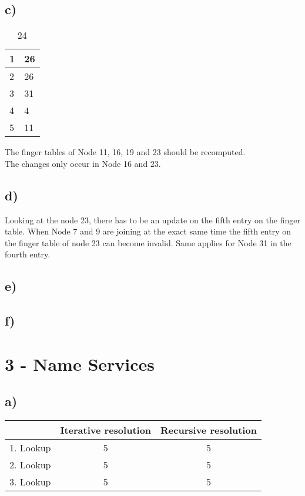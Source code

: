 \documentclass{scrartcl}
\begin{document}
\subsection*{c)}
\begin{table}[!ht]
	\centering
	\begin{tabular}{|l|l|}
		\hline
		1 & 26 \\ \hline
		2 & 26 \\ \hline
		3 & 31 \\ \hline
		4 & 4 \\ \hline
		5 & 11 \\ \hline
	\end{tabular}
	\caption{24}
\end{table}
The finger tables of Node 11, 16, 19 and 23 should be recomputed.\\
The changes only occur in Node 16 and 23.
\subsection*{d)}
Looking at the node 23, there has to be an update on the fifth entry on the finger table. When Node 7 and 9 are joining at the exact same time the fifth entry on the finger table of node 23 can become invalid. Same applies for Node 31 in the fourth entry.
\subsection*{e)}
\subsection*{f)}


\section*{3 - Name Services}
\subsection*{a)}
\begin{table}[!ht]
	\centering
	\begin{tabular}{|c|c|c|}
		\hline
		& Iterative resolution & Recursive resolution \\ \hline
		1. Lookup & 5 & 5 \\ \hline
		2. Lookup & 5 & 5 \\ \hline
		3. Lookup & 5 & 5 \\ \hline
	\end{tabular}
\end{table}
\end{document}

